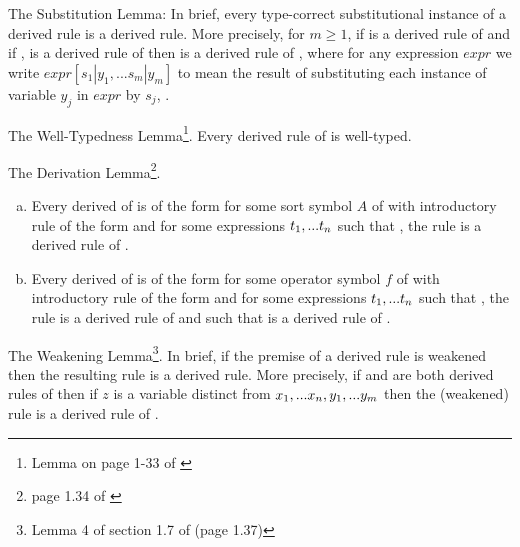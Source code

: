 \note The Substitution Lemma: In brief, every type-correct substitutional instance of a derived rule is a derived rule. More precisely, for $m \geq 1$, if  is a derived rule of \gatUw 
and if  \foreachj,  is a derived rule of \gatUw
then  is a derived rule of \gatU, where
for any expression $expr$ we write
$expr[s_1|y_1,...s_m|y_m]$ to mean
the result of substituting each instance of variable $y_j$ in $expr$ by $s_j$, \foreachj.

\note The Well-Typedness Lemma\footnote{Lemma on page 1-33 of \cite{Cartmell78}}. Every derived rule of \gatUw is well-typed. 

\note The Derivation Lemma\footnote{page 1.34 of \cite{Cartmell78}}. 
\begin{enumerate}[(a)]

\item Every derived \Trule of \gatUw is of the form
 for some sort symbol $A$ of \gatUw with introductory rule of the form
 and for some expressions $t_1,...t_n$ such that \foreachi, the rule
 is a derived rule of \gatU.

\item Every derived \trule of \gatUw is of the form
 for some operator symbol $f$ of \gatUw 
with introductory rule of the form
and for some expressions $t_1,...t_n$ such that \foreachi, the rule
 is a derived rule of \gatUw
and such that
 is a derived rule of \gatU.
\end{enumerate}

\note The Weakening Lemma\footnote{Lemma 4 of section 1.7 of \cite{Cartmell78} (page 1.37)}. In brief, if the premise of a derived rule is weakened then the resulting rule is a derived rule. More precisely, if 
  and
 are both derived rules of \gatUw then if $z$ is a variable
distinct from $x_1,...x_n,y_1,...y_m$ then
the (weakened) rule  is a derived rule
of \gatU.

